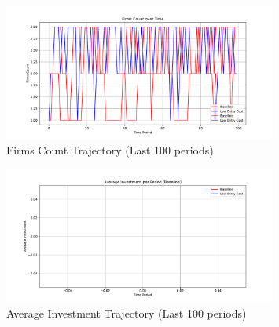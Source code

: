 \documentclass[12pt]{article}[margin=1in]
\begin{document}
\newpage
\begin{figure}[!htbp]
    \centering
    \includegraphics[width=0.8\textwidth]{../Figures/Firms_count_end.pdf}
    \caption{Firms Count Trajectory (Last 100 periods)}
\end{figure}
\begin{figure}[!htbp]
    \centering
    \includegraphics[width=0.8\textwidth]{../Figures/Average_investment_trajectory_end.pdf}
    \caption{Average Investment Trajectory (Last 100 periods)}
\end{figure}


% 
\end{document}
